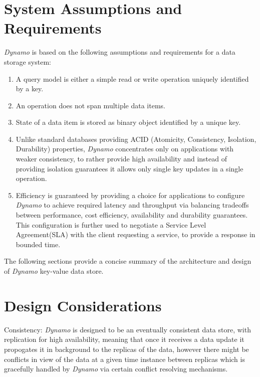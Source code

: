 \documentclass[12pt, a4paper]{article}
\begin{document}
\section*{System Assumptions and Requirements}
\textit{Dynamo}\cite{DeCandia:2007:DAH:1294261.1294281} is based on the following assumptions and requirements for a data storage system:
\begin{enumerate}
        \setlength\itemsep{0em}
        \item A query model is either a simple read or write operation uniquely identified by a key.
        \item An operation does not span multiple data items.
        \item State of a data item is stored as binary object identified by a unique key.
        \item Unlike standard databases providing ACID (Atomicity, Consistency, Isolation, Durability) properties, \textit{Dynamo}\cite{DeCandia:2007:DAH:1294261.1294281} concentrates only on applications with weaker consistency, to rather provide high availability and instead of providing isolation guarantees it allows only single key updates in a single operation.
        \item Efficiency is guaranteed by providing a choice for applications to configure \textit{Dynamo}\cite{DeCandia:2007:DAH:1294261.1294281} to achieve required latency and throughput via balancing tradeoffs between performance, cost efficiency, availability and durability guarantees. This configuration is further used to negotiate a Service Level Agreement(SLA) with the client requesting a service, to provide a response in bounded time.
\end{enumerate}

The following sections provide a concise summary of the architecture and design of \textit{Dynamo}\cite{DeCandia:2007:DAH:1294261.1294281} key-value data store.

\section*{Design Considerations}
Consistency: \textit{Dynamo}\cite{DeCandia:2007:DAH:1294261.1294281} is designed to be an eventually consistent data store, with replication for high availability, meaning that once it receives a data update it propogates it in background to the replicas of the data, however there might be conflicts in view of the data at a given time instance between replicas which is gracefully handled by \textit{Dynamo}\cite{DeCandia:2007:DAH:1294261.1294281} via certain conflict resolving mechanisms.\par
\end{document}
